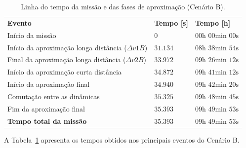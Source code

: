 \begin{table}[H]
\centering
\caption{Linha do tempo da missão e das fases de aproximação (Cenário B).}
\label{tab_cap4_linha_tempo_B}
\begin{tabularx}{\linewidth}{|
  >{\raggedright\arraybackslash}X|
  >{\centering\arraybackslash}X|
  >{\centering\arraybackslash}X|}
\hline
\textbf{Evento} &
\textbf{Tempo [s]} &
\textbf{Tempo [h]} \\
\hhline{|=|=|=|}
Início da missão  & $0$ & $00\text{h }00\text{min }00\text{s}$ \\
\hline
Início da aproximação longa distância ($\Delta v1B$) &$31.134$ &$08\text{h }38\text{min }54\text{s}$ \\
\hline
Final da aproximação longa distância ($\Delta v2B$) &$33.972$ &$09\text{h }26\text{min }12\text{s}$ \\
\hline
Início da aproximação curta distância  &$34.872$ &$09\text{h }41\text{min }12\text{s}$ \\
\hline
Início da aproximação final  &$34.940$ &$09\text{h }42\text{min }20\text{s}$ \\
\hline
Comutação entre as dinâmicas & $35.325$ & $09\text{h }48\text{min }45\text{s}$ \\
\hline
Fim da aproximação final  &$35.393$ &$09\text{h }49\text{min }53\text{s}$ \\
\hline
\textbf{Tempo total da missão}  &$35.393$ &$09\text{h }49\text{min }53\text{s}$ \\
\hline
\end{tabularx}
\end{table}

A Tabela~\ref{tab_cap4_linha_tempo_B} apresenta os tempos obtidos nos principais eventos do Cenário B.